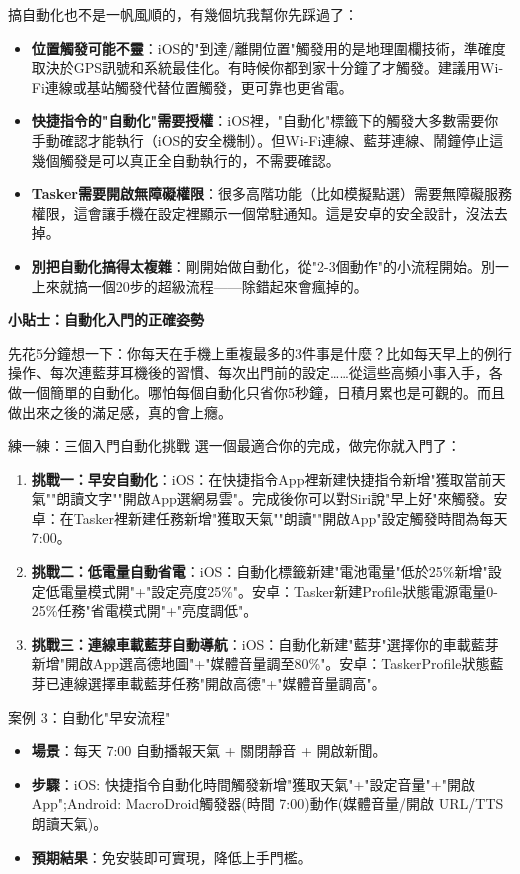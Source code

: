 搞自動化也不是一帆風順的，有幾個坑我幫你先踩過了：

\begin{itemize}
  \item \textbf{位置觸發可能不靈}：iOS的"到達/離開位置"觸發用的是地理圍欄技術，準確度取決於GPS訊號和系統最佳化。有時候你都到家十分鐘了才觸發。建議用Wi-Fi連線或基站觸發代替位置觸發，更可靠也更省電。
  \item \textbf{快捷指令的"自動化"需要授權}：iOS裡，"自動化"標籤下的觸發大多數需要你手動確認才能執行（iOS的安全機制）。但Wi-Fi連線、藍芽連線、鬧鐘停止這幾個觸發是可以真正全自動執行的，不需要確認。
  \item \textbf{Tasker需要開啟無障礙權限}：很多高階功能（比如模擬點選）需要無障礙服務權限，這會讓手機在設定裡顯示一個常駐通知。這是安卓的安全設計，沒法去掉。
  \item \textbf{別把自動化搞得太複雜}：剛開始做自動化，從"2-3個動作"的小流程開始。別一上來就搞一個20步的超級流程——除錯起來會瘋掉的。
\end{itemize}

\textbf{小貼士：自動化入門的正確姿勢}\par

先花5分鐘想一下：你每天在手機上重複最多的3件事是什麼？比如每天早上的例行操作、每次連藍芽耳機後的習慣、每次出門前的設定……從這些高頻小事入手，各做一個簡單的自動化。哪怕每個自動化只省你5秒鐘，日積月累也是可觀的。而且做出來之後的滿足感，真的會上癮。

\begin{tcbpractice}{練一練：三個入門自動化挑戰}
選一個最適合你的完成，做完你就入門了：

\begin{enumerate}
  \item \textbf{挑戰一：早安自動化}：iOS：在快捷指令App裡新建快捷指令新增"獲取當前天氣""朗讀文字""開啟App選網易雲"。完成後你可以對Siri說"早上好"來觸發。安卓：在Tasker裡新建任務新增"獲取天氣""朗讀""開啟App"設定觸發時間為每天7:00。
  \item \textbf{挑戰二：低電量自動省電}：iOS：自動化標籤新建"電池電量"低於25\%新增"設定低電量模式開"+"設定亮度25\%"。安卓：Tasker新建Profile狀態電源電量0-25\%任務"省電模式開"+"亮度調低"。
  \item \textbf{挑戰三：連線車載藍芽自動導航}：iOS：自動化新建"藍芽"選擇你的車載藍芽新增"開啟App選高德地圖"+"媒體音量調至80\%"。安卓：TaskerProfile狀態藍芽已連線選擇車載藍芽任務"開啟高德"+"媒體音量調高"。
\end{enumerate}

\end{tcbpractice}

\begin{tcbinfo}{案例 3：自動化"早安流程"}
\begin{itemize}
  \item \textbf{場景}：每天 7:00 自動播報天氣 + 關閉靜音 + 開啟新聞。
  \item \textbf{步驟}：iOS: 快捷指令自動化時間觸發新增"獲取天氣"+"設定音量"+"開啟 App";Android: MacroDroid觸發器(時間 7:00)動作(媒體音量/開啟 URL/TTS 朗讀天氣)。
  \item \textbf{預期結果}：免安裝即可實現，降低上手門檻。
\end{itemize}

\end{tcbinfo}
